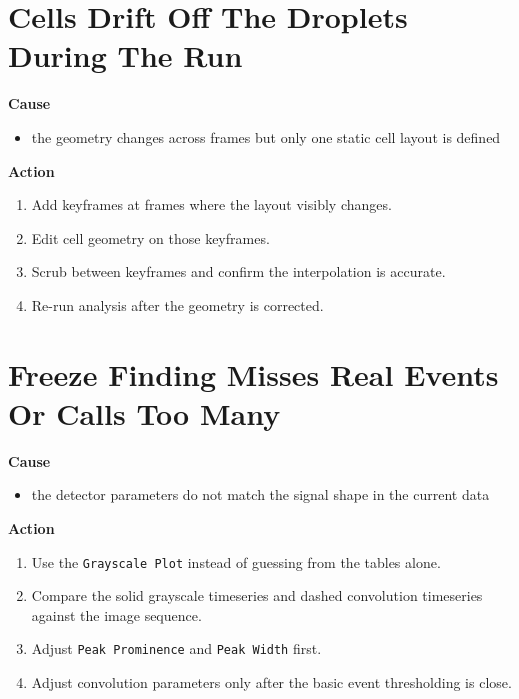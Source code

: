 \documentclass[
  9pt,
  letterpaper,
  oneside,
  open=any,
  DIV=15,
  parskip=half-,
  headings=big,
  numbers=noenddot
]{scrbook}
\newcommand{\manuallead}[1]{%
  \vspace{0.15em}%
  {\sffamily\bfseries\color{ManualBlue}#1}\par\nobreak\vspace{0.05em}%
}
\begin{document}
\section{Cells Drift Off The Droplets During The Run}

\manuallead{Cause}

\begin{itemize}[leftmargin=*,itemsep=0.35em,topsep=0.4em]
\item the geometry changes across frames but only one static cell layout is defined
\end{itemize}

\manuallead{Action}

\begin{enumerate}[leftmargin=*,itemsep=0.35em,topsep=0.4em]
\item Add keyframes at frames where the layout visibly changes.
\item Edit cell geometry on those keyframes.
\item Scrub between keyframes and confirm the interpolation is accurate.
\item Re-run analysis after the geometry is corrected.
\end{enumerate}

\section{Freeze Finding Misses Real Events Or Calls Too Many}

\manuallead{Cause}

\begin{itemize}[leftmargin=*,itemsep=0.35em,topsep=0.4em]
\item the detector parameters do not match the signal shape in the current data
\end{itemize}

\manuallead{Action}

\begin{enumerate}[leftmargin=*,itemsep=0.35em,topsep=0.4em]
\item Use the \texttt{Grayscale Plot} instead of guessing from the tables alone.
\item Compare the solid grayscale timeseries and dashed convolution timeseries against the image sequence.
\item Adjust \texttt{Peak Prominence} and \texttt{Peak Width} first.
\item Adjust convolution parameters only after the basic event thresholding is close.
\end{enumerate}
\end{document}
